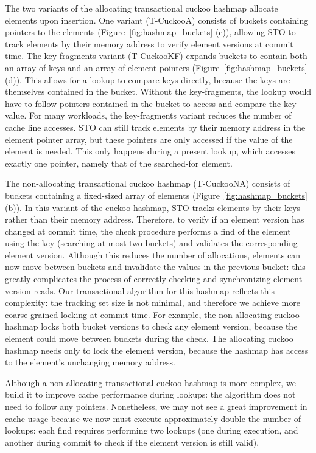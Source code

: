 The two variants of the allocating transactional cuckoo hashmap allocate elements upon insertion. One variant (T-CuckooA) consists of buckets containing pointers to the elements (Figure~\ref{fig:hashmap_buckets} (c)), allowing STO to track elements by their memory address to verify element versions at commit time. The key-fragments variant (T-CuckooKF) expands buckets to contain both an array of keys and an array of element pointers (Figure~\ref{fig:hashmap_buckets} (d)). This allows for a lookup to compare keys directly, because the keys are themselves contained in the bucket. Without the key-fragments, the lookup would have to follow pointers contained in the bucket to access and compare the key value. For many workloads, the key-fragments variant reduces the number of cache line accesses. STO can still track elements by their memory address in the element pointer array, but these pointers are only accessed if the value of the element is needed. This only happens during a present lookup, which accesses exactly one pointer, namely that of the searched-for element.

The non-allocating transactional cuckoo hashmap (T-CuckooNA) consists of buckets containing a fixed-sized array of elements (Figure~\ref{fig:hashmap_buckets} (b)). In this variant of the cuckoo hashmap, STO tracks elements by their keys rather than their memory address. Therefore, to verify if an element version has changed at commit time, the check procedure performs a find of the element using the key (searching at most two buckets) and validates the corresponding element version. Although this reduces the number of allocations, elements can now move between buckets and invalidate the values in the previous bucket: this greatly complicates the process of correctly checking and synchronizing element version reads. Our transactional algorithm for this hashmap reflects this complexity: the tracking set size is not minimal, and therefore we achieve more coarse-grained locking at commit time. For example, the non-allocating cuckoo hashmap locks both bucket versions to check any element version, because the element could move between buckets during the check. The allocating cuckoo hashmap needs only to lock the element version, because the hashmap has access to the element's unchanging memory address. 

Although a non-allocating transactional cuckoo hashmap is more complex, we build it to improve cache performance during lookups: the algorithm does not need to follow any pointers. Nonetheless, we may not see a great improvement in cache usage because we now must execute approximately double the number of lookups: each find requires performing two lookups (one during execution, and another during commit to check if the element version is still valid).


